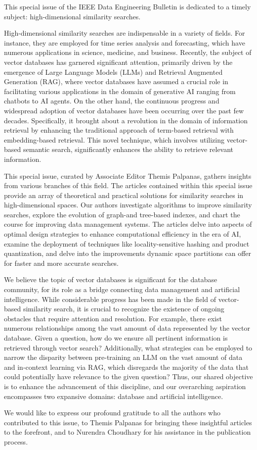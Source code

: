 \documentclass[11pt]{article}
\begin{document}
This special issue of the IEEE Data Engineering Bulletin is dedicated to a timely subject: high-dimensional similarity searches. 

High-dimensional similarity searches are indispensable in a variety of fields. For instance, they are employed for time series analysis and forecasting, which have numerous applications in science, medicine, and business. Recently, the subject of vector databases has garnered significant attention, primarily driven by the emergence of Large Language Models (LLMs) and Retrieval Augmented Generation (RAG), where  vector databases have assumed a crucial role in facilitating various applications in the domain of generative AI ranging from  chatbots to AI agents. On the other hand, the continuous progress and widespread adoption of vector databases have been occurring over the past few decades. Specifically, it brought about a revolution in the domain of information retrieval by enhancing the traditional approach of term-based retrieval with embedding-based retrieval. This novel technique, which involves utilizing vector-based semantic search, significantly enhances the ability to retrieve relevant information. 

This special issue, curated by Associate Editor Themis Palpanas,  gathers insights from various branches of this field. The articles contained within this special issue provide an array of theoretical and practical solutions for similarity searches in high-dimensional spaces. Our authors investigate algorithms to improve similarity searches, explore the evolution of graph-and tree-based indexes, and chart the course for improving data management systems. The articles delve into aspects of optimal design strategies to enhance computational efficiency in the era of AI, examine the deployment of techniques like locality-sensitive hashing and product quantization, and delve into the improvements dynamic space partitions can offer for faster and more accurate searches.

We believe the topic of vector databases is significant for the database community, for its role as a bridge connecting data management and artificial intelligence.  While considerable progress has been made in the field of vector-based similarity search, it is crucial to recognize the existence of ongoing obstacles that require attention and resolution. For example, there exist numerous relationships among the vast amount of data represented by the vector database. Given a question, how do we ensure all pertinent information is retrieved through vector search?  Additionally, what strategies can be employed to narrow the disparity between pre-training an LLM on the vast amount of data and in-context learning via RAG, which disregards the majority of the data that could potentially have relevance to the given question? Thus, our shared objective is to enhance the advancement of this discipline, and our overarching aspiration encompasses two expansive domains: database and artificial intelligence. 

We would like to express our profound gratitude to all the authors who contributed to this issue, to Themis Palpanas for bringing these insightful articles to the forefront, and to Nurendra Choudhary for his assistance in the publication process.
\end{document}
